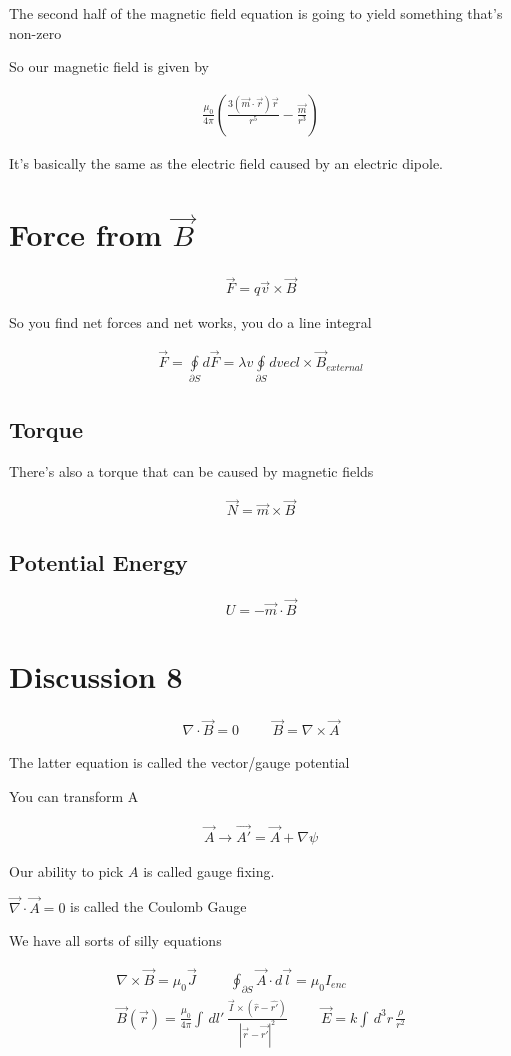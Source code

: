 \documentclass[fleqn]{report}
\newcommand{\hp}{\hspace{1cm}}
\newcommand{\del}{\partial}
\newcommand{\equations} [1] {
\begin{gather*}
#1
\end{gather*}
}
\begin{document}
The second half of the magnetic field equation is going to yield 
something that's non-zero 

So our magnetic field is given by 
\equations{
    \frac{\mu_0}{4 \pi}
    \left(
        \frac{3(\vec m \cdot \vec r) \vec r}{r^5}
        -
    \frac{\vec m}{r^3}
    \right)
}

It's basically the same as the electric field caused by an electric dipole.

\section{Force from $\vec B$}
\equations{
    \vec F =
    q \vec v \times \vec B
}

So you find net forces and net works, you do a line integral 

\equations{
    \vec F 
    =
    \oint\limits_{\del S} d \vec F 
    =
    \lambda v 
    \oint\limits_{\del S} d vec l \times \vec B_{external}
}

\subsection{Torque}
There's also a torque that can be caused by magnetic fields 

\equations{
    \vec N = \vec m \times \vec B 
}

\subsection{Potential Energy}
\equations{
    U 
    =
    - \vec m \cdot \vec B 
}

\section{Discussion 8}
\equations{
    \nabla \cdot \vec B = 0
    \hp 
    \vec B = \nabla \times \vec A 
}
The latter equation is called the vector/gauge potential 

You can transform A 
\equations{
    \vec A 
    \rightarrow 
    \vec{A'}
    =
    \vec A + \nabla \psi
}
Our ability to pick $A$ is called gauge fixing. 

$\vec \nabla \cdot \vec A = 0$ is called the Coulomb Gauge 

We have all sorts of silly equations 
\equations{
    \nabla \times \vec B = \mu_0 \vec J 
    \hp 
    \oint_{\del S} \vec A \cdot d \vec l 
    =
    \mu_0 I_{enc}
    \\
    \vec B(\vec r)
    =
    \frac{\mu_0}{4 \pi} 
    \int \, dl' \, 
    \frac{\vec I \times (\hat r - \hat{r'})}{|\vec r - \vec{r'}|^2}
    \hp 
    \vec E = 
    k 
    \int \, d^3 r \, 
    \frac{\rho}{r^2}
}
\end{document}
